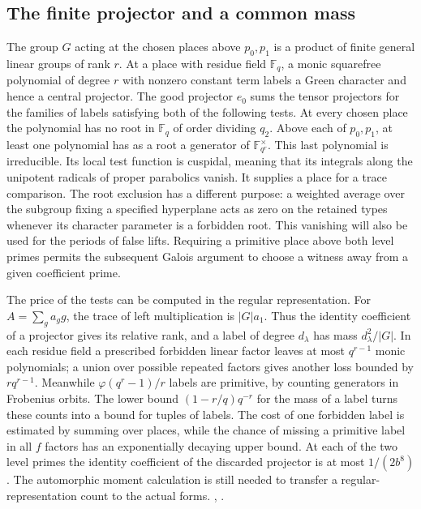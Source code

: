 \subsection{The finite projector and a common mass}

The group \(G\) acting at the chosen places above \(p_0,p_1\) is a product of finite general linear groups of rank \(r\). At a place with residue field \(\mathbb F_q\), a monic squarefree polynomial of degree \(r\) with nonzero constant term labels a Green character and hence a central projector. The good projector \(e_0\) sums the tensor projectors for the families of labels satisfying both of the following tests. At every chosen place the polynomial has no root in \(\mathbb F_q\) of order dividing \(q_2\). Above each of \(p_0,p_1\), at least one polynomial has as a root a generator of \(\mathbb F_{q^r}^\times\). This last polynomial is irreducible. Its local test function is cuspidal, meaning that its integrals along the unipotent radicals of proper parabolics vanish. It supplies a place for a trace comparison. The root exclusion has a different purpose: a weighted average over the subgroup fixing a specified hyperplane acts as zero on the retained types whenever its character parameter is a forbidden root. This vanishing will also be used for the periods of false lifts. Requiring a primitive place above both level primes permits the subsequent Galois argument to choose a witness away from a given coefficient prime.

The price of the tests can be computed in the regular representation. For \(A=\sum_g a_g g\), the trace of left multiplication is \(|G|a_1\). Thus the identity coefficient of a projector gives its relative rank, and a label of degree \(d_\lambda\) has mass \(d_\lambda^2/|G|\). In each residue field a prescribed forbidden linear factor leaves at most \(q^{r-1}\) monic polynomials; a union over possible repeated factors gives another loss bounded by \(rq^{r-1}\). Meanwhile \(\varphi(q^r-1)/r\) labels are primitive, by counting generators in Frobenius orbits. The lower bound \((1-r/q)q^{-r}\) for the mass of a label turns these counts into a bound for tuples of labels. The cost of one forbidden label is estimated by summing over places, while the chance of missing a primitive label in all \(f\) factors has an exponentially decaying upper bound. At each of the two level primes the identity coefficient of the discarded projector is at most \(1/(2b^8)\). The automorphic moment calculation is still needed to transfer a regular-representation count to the actual forms. , .


